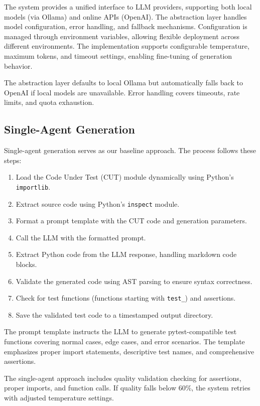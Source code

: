 \documentclass[11pt]{article}
\begin{document}
The system provides a unified interface to LLM providers, supporting both local models (via Ollama) and online APIs (OpenAI). The abstraction layer handles model configuration, error handling, and fallback mechanisms. Configuration is managed through environment variables, allowing flexible deployment across different environments. The implementation supports configurable temperature, maximum tokens, and timeout settings, enabling fine-tuning of generation behavior.

The abstraction layer defaults to local Ollama but automatically falls back to OpenAI if local models are unavailable. Error handling covers timeouts, rate limits, and quota exhaustion.

\subsection{Single-Agent Generation}

Single-agent generation serves as our baseline approach. The process follows these steps:

\begin{enumerate}
\item Load the Code Under Test (CUT) module dynamically using Python's \texttt{importlib}.
\item Extract source code using Python's \texttt{inspect} module.
\item Format a prompt template with the CUT code and generation parameters.
\item Call the LLM with the formatted prompt.
\item Extract Python code from the LLM response, handling markdown code blocks.
\item Validate the generated code using AST parsing to ensure syntax correctness.
\item Check for test functions (functions starting with \texttt{test\_}) and assertions.
\item Save the validated test code to a timestamped output directory.
\end{enumerate}

The prompt template instructs the LLM to generate pytest-compatible test functions covering normal cases, edge cases, and error scenarios. The template emphasizes proper import statements, descriptive test names, and comprehensive assertions.

The single-agent approach includes quality validation checking for assertions, proper imports, and function calls. If quality falls below 60\%, the system retries with adjusted temperature settings.
\end{document}
